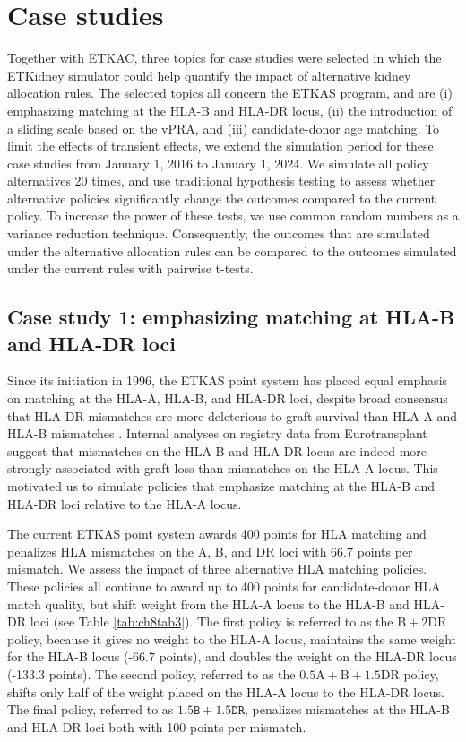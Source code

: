 \documentclass[11pt,twoside,]{book}
\begin{document}
\FloatBarrier

\section{Case studies}\label{sec:etkidneycasestudies}

Together with ETKAC, three topics for case studies were selected in
which the ETKidney simulator could help quantify the impact of
alternative kidney allocation rules. The selected
topics all concern the ETKAS program, and are (i) emphasizing matching at the HLA-B and HLA-DR locus,
(ii) the introduction of a sliding scale based on
the vPRA, and (iii) candidate-donor age matching. To limit the effects of
transient effects, we extend the simulation period for these case
studies from January 1, 2016 to January 1, 2024. We simulate all policy
alternatives 20 times, and use traditional hypothesis testing to assess
whether alternative policies significantly change the outcomes compared
to the current policy. To increase the power of these tests, we use common
random numbers \citep{lawSimulationModelingAnalysis2015} as a variance
reduction technique. Consequently, the outcomes that are simulated under the
alternative allocation rules can be compared to the outcomes simulated under
the current rules with pairwise t-tests.

\subsection{Case study 1: emphasizing matching at HLA-B and HLA-DR loci}\label{sec:etkidneycasestudyhla}

Since its initiation in 1996, the ETKAS point system has placed equal emphasis
on matching at the HLA-A, HLA-B, and HLA-DR loci, despite broad
consensus that HLA-DR mismatches are more deleterious to graft survival
than HLA-A and HLA-B mismatches
\citep{vereerstraetenExperienceWujciakOpelzAllocation1998, Roberts2004}.
Internal analyses on registry data from Eurotransplant suggest that
mismatches on the HLA-B and HLA-DR locus are indeed more strongly associated with graft
loss than mismatches on the HLA-A locus. This motivated us to simulate
policies that emphasize matching at the HLA-B and HLA-DR loci relative to the
HLA-A locus.

The current ETKAS point system awards 400 points for HLA matching and
penalizes HLA mismatches on the A, B, and DR loci with 66.7 points per
mismatch. We assess the impact of three alternative HLA matching
policies. These policies all continue to award up to 400 points for
candidate-donor HLA match quality, but shift weight from the HLA-A
locus to the HLA-B and HLA-DR loci (see Table \ref{tab:ch8tab3}).
The first policy is referred
to as the \(\text{B} + 2\text{DR}\) policy, because it gives no weight to
the HLA-A locus, maintains the same weight for the HLA-B locus (-66.7 points),
and doubles the weight on the HLA-DR locus (-133.3 points). The second
policy, referred to as the \(0.5\text{A} + \text{B} + 1.5\text{DR}\)
policy, shifts only half of the weight placed on the HLA-A locus to the HLA-DR
locus. The final policy, referred to as
\(1.5\texttt{B} + 1.5\texttt{DR}\), penalizes mismatches at the HLA-B and HLA-DR
loci both with 100 points per mismatch.
\end{document}
